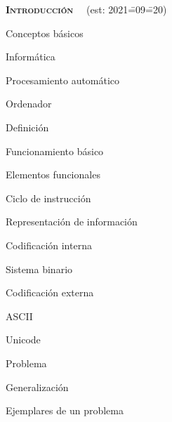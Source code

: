 \begin{longenum}
    \item \textbf{\textsc{Introducción}} \ \ (est: 2021\==09\==20)
    \begin{longenum}
        \item Conceptos básicos
        \begin{longenum}
            \item Informática
            \begin{longenum}
                \item Procesamiento automático
            \end{longenum}
            \item Ordenador
            \begin{longenum}
                \item Definición
                \item Funcionamiento básico
                \begin{longenum}
                    \item Elementos funcionales
                    \item Ciclo de instrucción
                    \item Representación de información
                    \begin{longenum}
                        \item Codificación interna
                        \begin{longenum}
                            \item Sistema binario
                        \end{longenum}
                        \item Codificación externa
                        \begin{longenum}
                            \item ASCII
                            \item Unicode
                        \end{longenum}
                    \end{longenum}
                \end{longenum}
            \end{longenum}
            \item Problema
            \begin{longenum}
                \item Generalización
                \item Ejemplares de un problema

\end{longenum}
\end{longenum}
\end{longenum}
\end{longenum}
